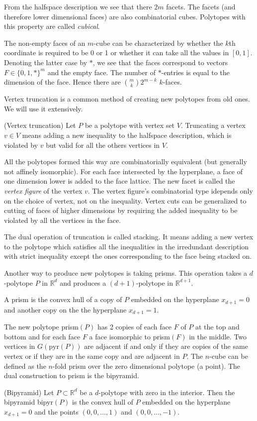 From the halfspace description we see that there $2m$ facets. The facets (and therefore lower dimensional faces)
are also combinatorial cubes. Polytopes with this property are called \textit{cubical}. 

The non-empty faces of an $m$-cube can be characterized by whether the $k$th coordinate 
is required to be 0 or 1 or whether it can take all the values in $[0,1]$. Denoting the latter case by $*$, we see
that the faces correspond to vectors $F \in \{0,1,*\}^m$ and the empty face. The number of $*$-entries 
is equal to the dimension of the face. Hence there are $\binom{m}{k} 2^{m-k}$ $k$-faces.


Vertex truncation is a common method of creating new polytopes from old ones.
We will use it extensively.
\begin{definition}
(Vertex truncation) Let $P$ be a polytope with vertex set $V$. Truncating a vertex $v \in V$ means adding
a new inequality to the halfspace description, which is violated by $v$ but valid for all the others vertices in $V$.
\end{definition}
All the polytopes formed this way are combinatorially equivalent (but generally not affinely isomorphic). 
For each face intersected by the hyperplane, 
a face of one dimension lower is added to the face lattice. The new facet is 
called the \textit{vertex figure} of the vertex $v$. The vertex figure's combinatorial type 
idepends only on the choice of vertex, not on the inequality. Vertex cuts can be generalized to cutting of 
faces of higher dimensions by requiring the added inequality to be violated by 
all the vertices in the face. 

The dual operation of truncation is called stacking. 
It means adding a new vertex to the polytope which satisfies all the 
inequalities in the irredundant description with strict inequality except the 
ones corresponding to the face being stacked on.

Another way to produce new polytopes is taking prisms. This operation takes a 
$d$-polytope $P$ in $\mathbb{R}^d$ and produces a $(d+1)$-polytope in 
$\mathbb{R}^{d+1}$. 
\begin{definition}
 A prism is the convex hull of a copy of $P$ embedded on the hyperplane 
$x_{d+1} = 0$ and another copy on the the hyperplane $x_{d+1} = 1$.
\end{definition}

 The new polytope prism$(P)$ has 2 copies of 
each face $F$ of $P$ at the top and bottom and for each face $F$ a face isomorphic to 
prism$(F)$ in the middle. Two vertices in $G(\text{pyr}(P))$ are adjacent if and only if
they are copies of the same vertex or if they are in the same copy and are 
adjacent in $P$. 
The $n$-cube can be defined as the $n$-fold 
prism over the zero dimensional polytope (a point). The dual construction to prism 
is the bipyramid. 
\begin{definition}
 (Bipyramid) Let $P\subset \mathbb{R}^d$ be a $d$-polytope with zero in the 
interior. Then the bipyramid bipyr$(P)$ is the convex hull of $P$ embedded on 
the hyperplane $x_{d+1} = 0$ and the points $(0,0,\dots, 1)$ and $(0,0,\dots, 
-1)$.
\end{definition}


